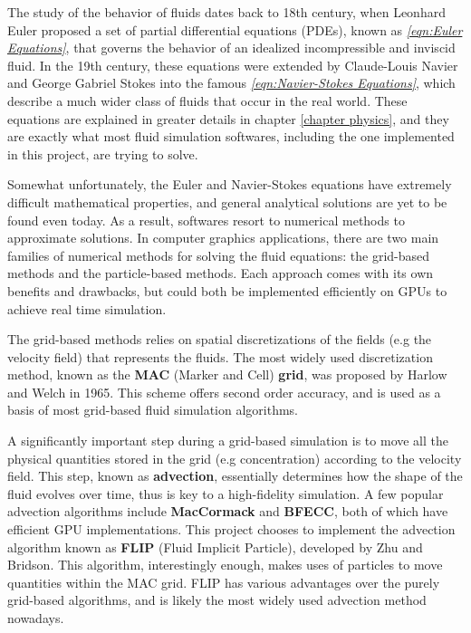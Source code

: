 The study of the behavior of fluids dates back to 18th century, when Leonhard Euler proposed a set of partial differential equations (PDEs), known as \textit{\ref{eqn:Euler Equations}}, that governs the behavior of an idealized incompressible and inviscid fluid. In the 19th century, these equations were extended by Claude-Louis Navier and George Gabriel Stokes into the famous \textit{\ref{eqn:Navier-Stokes Equations}}, which describe a much wider class of fluids that occur in the real world. These equations are explained in greater details in chapter \ref{chapter physics}, and they are exactly what most fluid simulation softwares, including the one implemented in this project, are trying to solve. 

Somewhat unfortunately, the Euler and Navier-Stokes equations have extremely difficult mathematical properties, and general analytical solutions are yet to be found even today. As a result, softwares resort to numerical methods to approximate solutions. In computer graphics applications, there are two main families of numerical methods for solving the fluid equations: the grid-based methods and the particle-based methods. Each approach comes with its own benefits and drawbacks, but could both be implemented efficiently on GPUs to achieve real time simulation.

The grid-based methods relies on spatial discretizations of the fields (e.g the velocity field) that represents the fluids. The most widely used discretization method, known as the \textbf{MAC} (Marker and Cell) \textbf{grid}, was proposed by Harlow and Welch \cite{harlow1965numerical} in 1965. This scheme offers second order accuracy, and is used as a basis of most grid-based fluid simulation algorithms. 

A significantly important step during a grid-based simulation is to move all the physical quantities stored in the grid (e.g concentration) according to the velocity field. This step, known as \textbf{advection}, essentially determines how the shape of the fluid evolves over time, thus is key to a high-fidelity simulation. A few popular advection algorithms include \textbf{MacCormack}\cite{selle2008unconditionally} and \textbf{BFECC}\cite{kim2005flowfixer}, both of which have efficient GPU implementations\cite{chentanez2011real}\cite{xu2011interactive}. This project chooses to implement the advection algorithm known as \textbf{FLIP} (Fluid Implicit Particle)\cite{zhu2005animating}, developed by Zhu and Bridson. This algorithm, interestingly enough, makes uses of particles to move quantities within the MAC grid. FLIP has various advantages over the purely grid-based algorithms, and is likely the most widely used advection method nowadays. 

